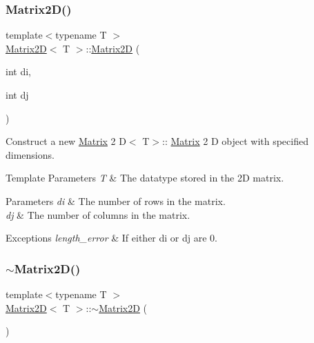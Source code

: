 \subsubsection{\texorpdfstring{Matrix2\+D()}{Matrix2D()}\hspace{0.1cm}{\footnotesize\ttfamily [2/3]}}
{\footnotesize\ttfamily template$<$typename T $>$ \\
\mbox{\hyperlink{classMatrix2D}{Matrix2D}}$<$ T $>$\+::\mbox{\hyperlink{classMatrix2D}{Matrix2D}} (\begin{DoxyParamCaption}\item[{int}]{di,  }\item[{int}]{dj }\end{DoxyParamCaption})}



Construct a new \mbox{\hyperlink{classMatrix}{Matrix}} 2 D$<$ T$>$\+:\+: \mbox{\hyperlink{classMatrix}{Matrix}} 2 D object with specified dimensions. 


\begin{DoxyTemplParams}{Template Parameters}
{\em T} & The datatype stored in the 2D matrix. \\
\hline
\end{DoxyTemplParams}

\begin{DoxyParams}{Parameters}
{\em di} & The number of rows in the matrix. \\
\hline
{\em dj} & The number of columns in the matrix.\\
\hline
\end{DoxyParams}

\begin{DoxyExceptions}{Exceptions}
{\em length\+\_\+error} & If either di or dj are 0. \\
\hline
\end{DoxyExceptions}
\mbox{\label{classMatrix2D_a6b86d001220161af2136ba49fd8b26b9}} 
\subsubsection{\texorpdfstring{$\sim$\+Matrix2\+D()}{~Matrix2D()}}
{\footnotesize\ttfamily template$<$typename T $>$ \\
\mbox{\hyperlink{classMatrix2D}{Matrix2D}}$<$ T $>$\+::$\sim$\mbox{\hyperlink{classMatrix2D}{Matrix2D}} (\begin{DoxyParamCaption}{ }\end{DoxyParamCaption})}



